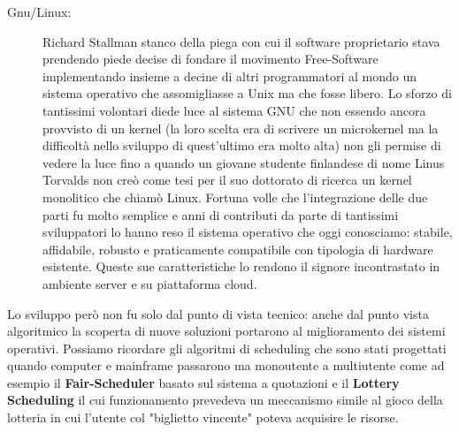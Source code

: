 \begin{description}
  \item[Gnu/Linux:] Richard Stallman stanco della piega con cui il software proprietario stava prendendo piede decise di fondare il movimento Free-Software implementando insieme a decine di altri programmatori al mondo un sistema operativo che assomigliasse a Unix ma che fosse libero. Lo sforzo di tantissimi volontari diede luce al sistema GNU che non essendo ancora provvisto di un kernel (la loro scelta era di scrivere un microkernel ma la difficoltà nello sviluppo di quest'ultimo era molto alta) non gli permise di vedere la luce fino a quando un giovane studente finlandese di nome Linus Torvalds non creò come tesi per il suo dottorato di ricerca un kernel monolitico che chiamò Linux. Fortuna volle che l'integrazione delle due parti fu molto semplice e anni di contributi da parte di tantissimi sviluppatori lo hanno reso il sistema operativo che oggi conosciamo: stabile, affidabile, robusto e praticamente compatibile con tipologia di hardware esistente. Queste sue caratteristiche lo rendono il signore incontrastato in ambiente server e su piattaforma cloud.
\end{description}
Lo sviluppo però non fu solo dal punto di vista tecnico: anche dal punto vista algoritmico la scoperta di nuove soluzioni portarono al miglioramento dei sistemi operativi. Possiamo ricordare gli algoritmi di scheduling che sono stati progettati quando computer e mainframe passarono ma monoutente a multiutente come ad esempio il \textbf{Fair-Scheduler} basato sul sistema a quotazioni\cite{kay89} e il \textbf{Lottery Scheduling} il cui funzionamento prevedeva un meccanismo simile al gioco della lotteria in cui l'utente col "biglietto vincente" poteva acquisire le risorse.\cite{waldspurger94}
